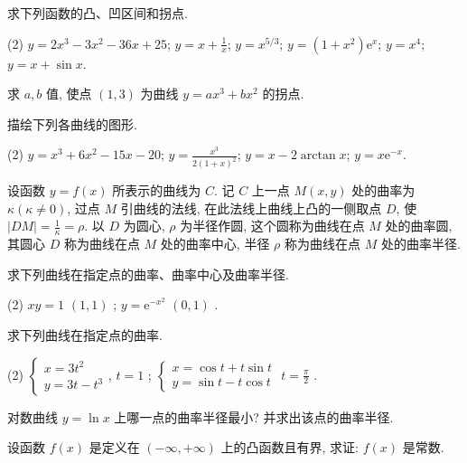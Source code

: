 \begin{exercise}[3.5.8]
    求下列函数的凸、凹区间和拐点.
    \begin{tasks}(2)
        \task $y = 2x^3 - 3x^2 - 36x + 25$;
        \task $y = x + \frac{1}{x}$;
        \task $y = x^{5/3}$;
        \task $y = (1 + x^2)\mathrm{e}^x$;
        \task $y = x^4$;
        \task $y = x + \sin x$.
    \end{tasks}
\end{exercise}

\begin{exercise}[3.5.9]
    求 $a, b$ 值, 使点 $(1, 3)$ 为曲线 $y = ax^3 + bx^2$ 的拐点.
\end{exercise}

\begin{exercise}[3.5.10]
    描绘下列各曲线的图形.
    \begin{tasks}(2)
        \task $y = x^3 + 6x^2 - 15x - 20$;
        \task $y = \frac{x^3}{2(1 + x)^2}$;
        \task $y = x - 2 \arctan x$;
        \task $y = x \mathrm{e}^{-x}$.
    \end{tasks}
\end{exercise}

\begin{exercise}[3.5.11]
    设函数 $y = f(x)$ 所表示的曲线为 $C$. 记 $C$ 上一点 $M(x, y)$ 处的曲率为 $\kappa (\kappa \ne 0)$, 过点 $M$ 引曲线的法线, 在此法线上曲线上凸的一侧取点 $D$, 使 $|DM| = \frac{1}{\kappa} = \rho$. 以 $D$ 为圆心, $\rho$ 为半径作圆, 这个圆称为曲线在点 $M$ 处的曲率圆, 其圆心 $D$ 称为曲线在点 $M$ 处的曲率中心, 半径 $\rho$ 称为曲线在点 $M$ 处的曲率半径.

    求下列曲线在指定点的曲率、曲率中心及曲率半径.
    \begin{tasks}(2)
        \task $xy = 1$  $(1, 1)$ ;
        \task $y = \mathrm{e}^{-x^2}$  $(0, 1)$ .
    \end{tasks}
\end{exercise}

\begin{exercise}[3.5.12]
    求下列曲线在指定点的曲率.
    \begin{tasks}(2)
        \task $\begin{cases} x = 3t^2 \\ y = 3t - t^3 \end{cases}$,  $t = 1$ ;
        \task $\begin{cases} x = \cos t + t \sin t \\ y = \sin t - t \cos t \end{cases}$  $t = \frac{\pi}{2}$ .
    \end{tasks}
\end{exercise}

\begin{exercise}[3.5.13]
    对数曲线 $y = \ln x$ 上哪一点的曲率半径最小? 并求出该点的曲率半径.
\end{exercise}

\begin{exercise}[3.5.14]
    设函数 $f(x)$ 是定义在 $(-\infty, +\infty)$ 上的凸函数且有界, 求证: $f(x)$ 是常数.
\end{exercise}

\newpage